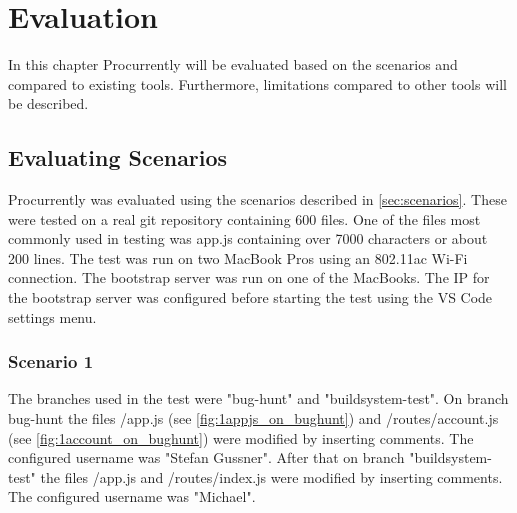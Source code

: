 \chapter{Evaluation}
\label{sec:results}

In this chapter Procurrently will be evaluated based on the scenarios and compared to existing tools.
Furthermore, limitations compared to other tools will be described.

\section{Evaluating Scenarios}

Procurrently was evaluated using the scenarios described in \autoref{sec:scenarios}.
These were tested on a real git repository containing 600 files. One of the files most commonly used in testing was app.js containing over 7000 characters or about 200 lines. The test was run on two MacBook Pros using an 802.11ac Wi-Fi connection.
The bootstrap server was run on one of the MacBooks. The IP for the bootstrap server was configured before starting the test using the VS Code settings menu. 

\subsection{Scenario 1}

The branches used in the test were "bug-hunt" and "buildsystem-test". On branch bug-hunt the files /app.js (see \autoref{fig:1appjs_on_bughunt}) and /routes/account.js (see \autoref{fig:1account_on_bughunt}) were modified by inserting comments. The configured username was "Stefan Gussner". 
After that on branch "buildsystem-test" the files /app.js and /routes/index.js were modified by inserting comments. The configured username was "Michael".


